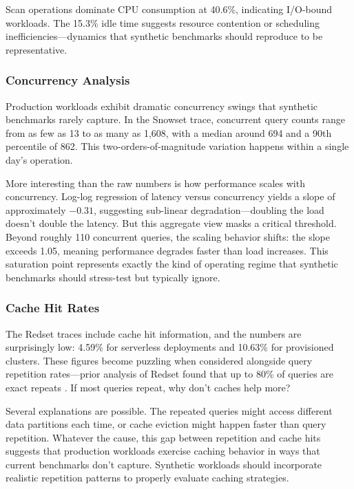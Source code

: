 \documentclass[12pt]{report}
\begin{document}
Scan operations dominate CPU consumption at 40.6\%, indicating I/O-bound workloads. The 15.3\% idle time suggests resource contention or scheduling inefficiencies---dynamics that synthetic benchmarks should reproduce to be representative.

\subsubsection{Concurrency Analysis}

Production workloads exhibit dramatic concurrency swings that synthetic benchmarks rarely capture. In the Snowset trace, concurrent query counts range from as few as 13 to as many as 1,608, with a median around 694 and a 90th percentile of 862. This two-orders-of-magnitude variation happens within a single day's operation.

More interesting than the raw numbers is how performance scales with concurrency. Log-log regression of latency versus concurrency yields a slope of approximately $-0.31$, suggesting sub-linear degradation---doubling the load doesn't double the latency. But this aggregate view masks a critical threshold. Beyond roughly 110 concurrent queries, the scaling behavior shifts: the slope exceeds 1.05, meaning performance degrades faster than load increases. This saturation point represents exactly the kind of operating regime that synthetic benchmarks should stress-test but typically ignore.

\subsubsection{Cache Hit Rates}

The Redset traces include cache hit information, and the numbers are surprisingly low: 4.59\% for serverless deployments and 10.63\% for provisioned clusters. These figures become puzzling when considered alongside query repetition rates---prior analysis of Redset found that up to 80\% of queries are exact repeats \cite{redset}. If most queries repeat, why don't caches help more?

Several explanations are possible. The repeated queries might access different data partitions each time, or cache eviction might happen faster than query repetition. Whatever the cause, this gap between repetition and cache hits suggests that production workloads exercise caching behavior in ways that current benchmarks don't capture. Synthetic workloads should incorporate realistic repetition patterns to properly evaluate caching strategies.
\end{document}

